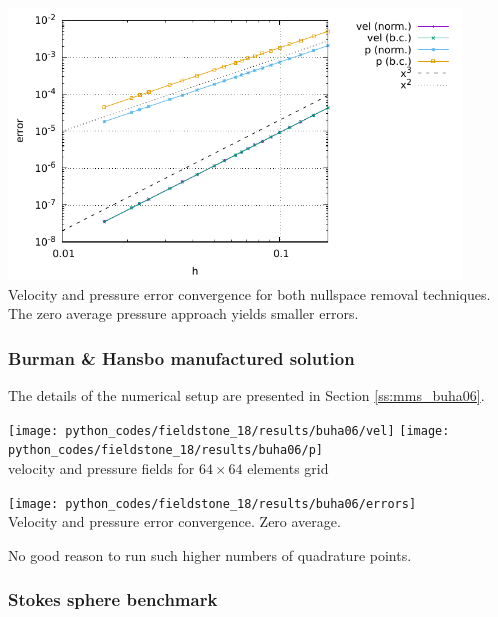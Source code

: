 \begin{center}
\includegraphics[width=12cm]{python_codes/fieldstone_18/results/mms/errors}\\
{\captionfont Velocity and pressure error convergence for both nullspace removal 
techniques. The zero average pressure approach yields smaller errors.}
\end{center}


\subsubsection*{Burman \& Hansbo manufactured solution}

The details of the numerical setup are presented in Section \ref{ss:mms_buha06}.

\begin{center}
\texttt{[image: python\_codes/fieldstone\_18/results/buha06/vel]}
\texttt{[image: python\_codes/fieldstone\_18/results/buha06/p]}\\
{\captionfont velocity and pressure fields for $64\times 64$ elements grid}
\end{center}

\begin{center}
\texttt{[image: python\_codes/fieldstone\_18/results/buha06/errors]}\\
{\captionfont Velocity and pressure error convergence. Zero average.}
\end{center}

No good reason to run such higher numbers of quadrature points.


\subsubsection*{Stokes sphere benchmark}

